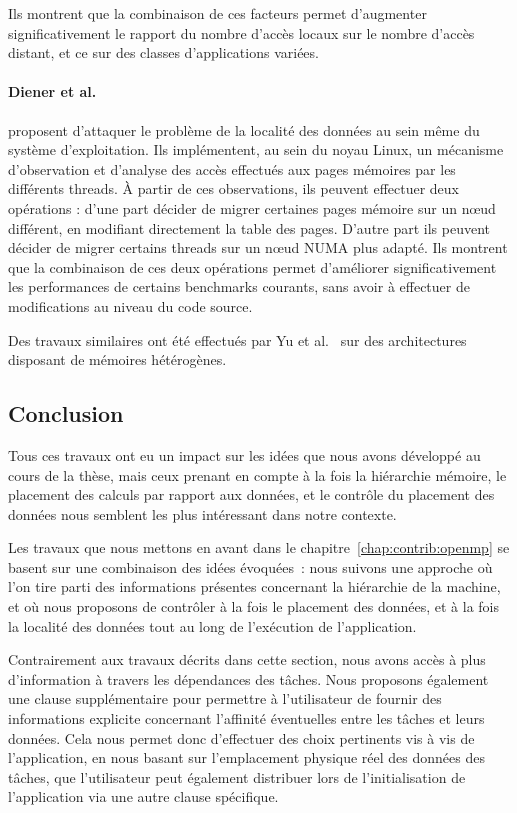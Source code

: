 Ils montrent que la combinaison de ces facteurs permet d'augmenter significativement le rapport du nombre d'accès locaux sur le nombre d'accès distant, et ce sur des classes d'applications variées.




\paragraph{Diener et al.~\cite{Diener2014}} proposent d'attaquer le problème de la localité des données au sein même du système d'exploitation.
Ils implémentent, au sein du noyau Linux, un mécanisme d'observation et d'analyse des accès effectués aux pages mémoires par les différents threads.
À partir de ces observations, ils peuvent effectuer deux opérations : d'une part décider de migrer certaines pages mémoire sur un nœud différent, en modifiant directement la table des pages.
D'autre part ils peuvent décider de migrer certains threads sur un nœud NUMA plus adapté.
Ils montrent que la combinaison de ces deux opérations permet d'améliorer significativement les performances de certains benchmarks courants, sans avoir à effectuer de modifications au niveau du code source.

Des travaux similaires ont été effectués par Yu et al.~\cite{Yu2017} sur des architectures disposant de mémoires hétérogènes.



\subsection*{Conclusion}

Tous ces travaux ont eu un impact sur les idées que nous avons développé au cours de la thèse, mais ceux prenant en compte à la fois la hiérarchie mémoire, le placement des calculs par rapport aux données, et le contrôle du placement des données nous semblent les plus intéressant dans notre contexte.

Les travaux que nous mettons en avant dans le chapitre~\ref{chap:contrib:openmp} se basent sur une combinaison des idées évoquées~: nous suivons une approche où l'on tire parti des informations présentes concernant la hiérarchie de la machine, et où nous proposons de contrôler à la fois le placement des données, et à la fois la localité des données tout au long de l'exécution de l'application.

Contrairement aux travaux décrits dans cette section, nous avons accès à plus d'information à travers les dépendances des tâches. Nous proposons également une clause supplémentaire pour permettre à l'utilisateur de fournir des informations explicite concernant l'affinité éventuelles entre les tâches et leurs données.
Cela nous permet donc d'effectuer des choix pertinents vis à vis de l'application, en nous basant sur l'emplacement physique réel des données des tâches, que l'utilisateur peut également distribuer lors de l'initialisation de l'application via une autre clause spécifique.
